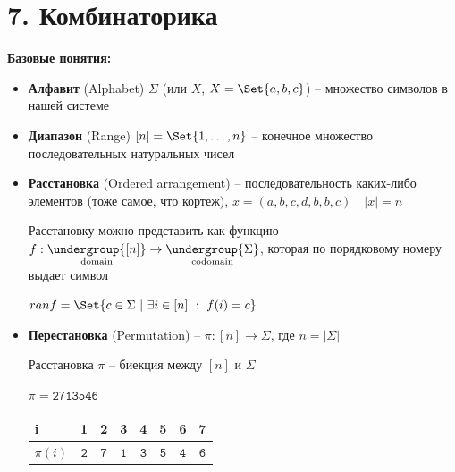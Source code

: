 \documentclass[12pt]{article}
\begin{document}
    \section{7. Комбинаторика}

    \textbf{Базовые понятия:}

    \begin{itemize}
        \item \textbf{Алфавит} (Alphabet) $\Sigma$ (или $X$, \Exs $X = \Set{a, b, c}$) -- множество символов в нашей системе

        \mediumvspace

        \item \textbf{Диапазон} (Range) $[n] = \Set{1, \dots, n}$ -- конечное множество последовательных натуральных чисел

        \mediumvspace

        \hypertarget{orderedarrangements}{}

        \item \textbf{Расстановка} (Ordered arrangement) -- последовательность каких-либо элементов (тоже самое, что кортеж),
        \Exs $x = (a, b, c, d, b, b, c) \quad |x| = n$

        Расстановку можно представить как функцию $f : \underset{\text{domain}}{\undergroup{[n]}} \to \underset{\text{codomain}}{\undergroup{\Sigma}}$, которая по порядковому номеру выдает символ

        $ran f = \Set{c \in \Sigma \ | \ \exists i \in [n]\ :\ f(i) = c}$

        \mediumvspace

        \hypertarget{permutation}{}

        \item \textbf{Перестановка} (Permutation) -- $\pi : [n] \to \Sigma$, где $n = |\Sigma|$

        Расстановка $\pi$ -- биекция между $[n]$ и $\Sigma$

        \Ex $\pi = \mathtt{2713546}$

        \smallvspace

        \begin{tabular}{l|ccccccc}
            i      & 1          & 2          & 3          & 4          & 5          & 6          & 7          \\
            \hline
            $\pi(i)$ & $\mathtt{2}$ & $\mathtt{7}$ & $\mathtt{1}$ & $\mathtt{3}$ & $\mathtt{5}$ & $\mathtt{4}$ & $\mathtt{6}$
        \end{tabular}


\end{itemize}
\end{document}
